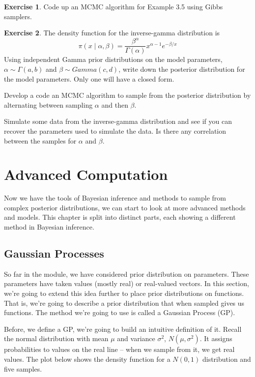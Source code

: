 \documentclass[
]{book}
\theoremstyle{definition}
\theoremstyle{definition}
\theoremstyle{definition}
\newtheorem{exercise}{Exercise}[chapter]
\theoremstyle{definition}
\theoremstyle{remark}
\begin{document}
\begin{exercise}
Code up an MCMC algorithm for Example 3.5 using Gibbs samplers.
\end{exercise}

\begin{exercise}
The density function for the inverse-gamma distribution is
\[
\pi(x\mid \alpha, \beta) = \frac{\beta^\alpha}{\Gamma(\alpha)}x^{\alpha - 1}e^{-\beta/x}
\]
Using independent Gamma prior distributions on the model parameters, \(\alpha \sim \Gamma(a, b)\) and \(\beta \sim Gamma(c, d)\), write down the posterior distribution for the model parameters. Only one will have a closed form.

Develop a code an MCMC algorithm to sample from the posterior distribution by alternating between sampling \(\alpha\) and then \(\beta\).

Simulate some data from the inverse-gamma distribution and see if you can recover the parameters used to simulate the data. Is there any correlation between the samples for \(\alpha\) and \(\beta\).
\end{exercise}

\hypertarget{advanced-computation}{%
\chapter{Advanced Computation}\label{advanced-computation}}

Now we have the tools of Bayesian inference and methods to sample from complex posterior distributions, we can start to look at more advanced methods and models. This chapter is split into distinct parts, each showing a different method in Bayesian inference.

\hypertarget{gaussian-processes}{%
\section{Gaussian Processes}\label{gaussian-processes}}

So far in the module, we have considered prior distribution on parameters. These parameters have taken values (mostly real) or real-valued vectors. In this section, we're going to extend this idea further to place prior distributions on functions. That is, we're going to describe a prior distribution that when sampled gives us functions. The method we're going to use is called a Gaussian Process (GP).

Before, we define a GP, we're going to build an intuitive definition of it. Recall the normal distribution with mean \(\mu\) and variance \(\sigma^2\), \(N(\mu, \sigma^2)\). It assigns probabilities to values on the real line -- when we sample from it, we get real values. The plot below shows the density function for a \(N(0, 1)\) distribution and five samples.
\end{document}
